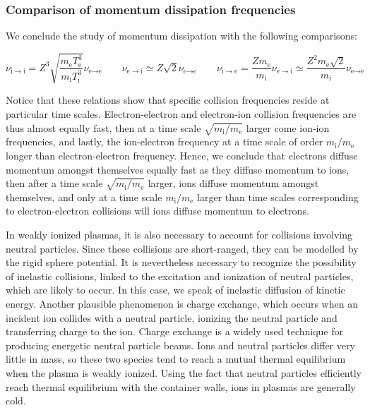 \subsubsection{Comparison of momentum dissipation frequencies}

We conclude the study of momentum dissipation with the following comparisons:

\begin{equation}
    \nu_{\mathrm{i}\to\mathrm{i}}=Z^3\sqrt{\frac{m_\text{e}T_\text{e}^3}{m_\mathrm{i}T_\mathrm{i}^3}}\nu_{\text{e}\to\text{e}}\qquad\nu_{\text{e}\to\mathrm{i}}\simeq Z\sqrt{2}\nu_{\text{e}\to\text{e}}\qquad\nu_{\mathrm{i}\to\text{e}}=\frac{Zm_\text{e}}{m_\mathrm{i}}\nu_{\text{e}\to\mathrm{i}}\simeq\frac{Z^2m_\text{e}\sqrt{2}}{m_\mathrm{i}}\nu_{\text{e}\to\text{e}}
\end{equation}

Notice that these relations show that specific collision frequencies reside at particular time scales. Electron-electron and electron-ion collision frequencies are thus almost equally fast, then at a time scale $\sqrt{m_\mathrm{i}/m_\text{e}}$ larger come ion-ion frequencies, and lastly, the ion-electron frequency at a time scale of order $m_\mathrm{i}/m_\text{e}$ longer than electron-electron frequency. Hence, we conclude that electrons diffuse momentum amongst themselves equally fast as they diffuse momentum to ions, then after a time scale $\sqrt{m_\mathrm{i}/m_\text{e}}$ larger, ions diffuse momentum amongst themselves, and only at a time scale $m_\mathrm{i}/m_\text{e}$ larger than time scales corresponding to electron-electron collisions will ions diffuse momentum to electrons.

\quad In weakly ionized plasmas, it is also necessary to account for collisions involving neutral particles. Since these collisions are short-ranged, they can be modelled by the rigid sphere potential. It is nevertheless necessary to recognize the possibility of inelastic collisions, linked to the excitation and ionization of neutral particles, which are likely to occur. In this case, we speak of inelastic diffusion of kinetic energy. Another plausible phenomenon is charge exchange, which occurs when an incident ion collides with a neutral particle, ionizing the neutral particle and transferring charge to the ion. Charge exchange is a widely used technique for producing energetic neutral particle beams. Ions and neutral particles differ very little in mass, so these two species tend to reach a mutual thermal equilibrium when the plasma is weakly ionized. Using the fact that neutral particles efficiently reach thermal equilibrium with the container walls, ions in plasmas are generally cold.

